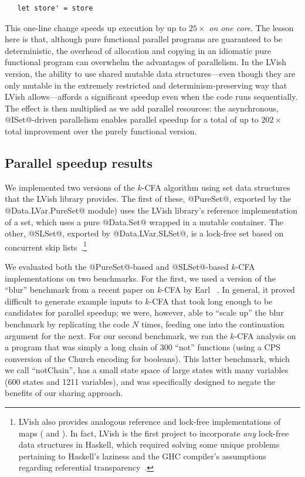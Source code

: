 \singlespacing
\begin{lstlisting}
   let store' = store 
\end{lstlisting}
\doublespacing

This one-line change speeds up execution by up to $25\times$ \emph{on
  one core}.  The lesson here is that, although pure functional
parallel programs are guaranteed to be deterministic, the overhead of
allocation and copying in an idiomatic pure functional program can
overwhelm the advantages of parallelism.  In the LVish version, the
ability to use shared mutable data structures---even though they are
only mutable in the extremely restricted and determinism-preserving
way that LVish allows---affords a significant speedup even when the
code runs sequentially.  The effect is then multiplied as we add
parallel resources: the asynchronous, @ISet@-driven parallelism
enables parallel speedup for a total of up to $202\times$ total
improvement over the purely functional version.

\subsection{Parallel speedup results}\label{subsection:lvish-parallel-speedup-results}

We implemented two versions of the $k$-CFA algorithm using set data
structures that the LVish library provides.  The first of these,
@PureSet@, exported by the @Data.LVar.PureSet@ module) uses the LVish
library's reference implementation of a set, which uses a pure
@Data.Set@ wrapped in a mutable container.  The other, @SLSet@,
exported by @Data.LVar.SLSet@, is a lock-free set based on concurrent
skip lists~\cite{art}.\footnote{LVish also provides analogous
  reference and lock-free implementations of maps ( and
  ).  In fact, LVish is the first project to incorporate
  \emph{any} lock-free data structures in Haskell, which required
  solving some unique problems pertaining to Haskell's laziness and
  the GHC compiler's assumptions regarding referential
  transparency~\cite{RyanAtomicPrimopsTalk}.}

We evaluated both the @PureSet@-based and @SLSet@-based $k$-CFA
implementations on two benchmarks. For the first, we used a version of
the ``blur'' benchmark from a recent paper on $k$-CFA by Earl
\etal~.  In general, it proved difficult to
generate example inputs to $k$-CFA that took long enough to be
candidates for parallel speedup; we were, however, able to ``scale
up'' the blur benchmark by replicating the code $N$ times, feeding one
into the continuation argument for the next.  For our second
benchmark, we ran the $k$-CFA analysis on a program that was simply a
long chain of $300$ ``not'' functions (using a CPS conversion of the
Church encoding for booleans).  This latter benchmark, which we call
``notChain'', has a small state space of large states with many
variables (600 states and 1211 variables), and was specifically
designed to negate the benefits of our sharing approach.

